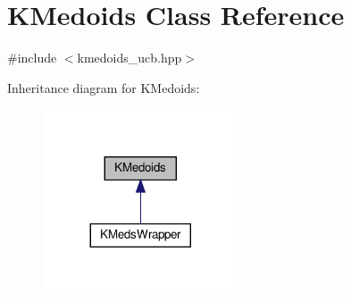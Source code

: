\hypertarget{classKMedoids}{}\section{K\+Medoids Class Reference}
\label{classKMedoids}


{\ttfamily \#include $<$kmedoids\+\_\+ucb.\+hpp$>$}



Inheritance diagram for K\+Medoids\+:\nopagebreak
\begin{figure}[H]
\begin{center}
\leavevmode
\includegraphics[width=164pt]{classKMedoids__inherit__graph}
\end{center}
\end{figure}

